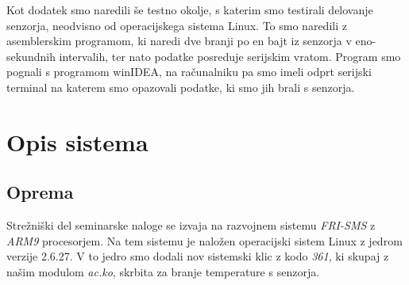\documentclass[10pt,a4paper]{article}
\begin{document}
Kot dodatek smo naredili še testno okolje, s katerim smo testirali delovanje senzorja, neodvisno od operacijskega sistema Linux. To smo naredili z asemblerskim programom, ki naredi dve branji po en bajt iz senzorja v eno-sekundnih intervalih, ter nato podatke posreduje serijskim vratom. Program smo pognali s programom winIDEA, na računalniku pa smo imeli odprt serijski terminal na katerem smo opazovali podatke, ki smo jih brali s senzorja.

\section{Opis sistema}
\subsection{Oprema}
Strežniški del seminarske naloge se izvaja na razvojnem sistemu \emph{FRI-SMS} z \emph{ARM9} procesorjem. Na tem sistemu je naložen operacijski sistem Linux z jedrom verzije 2.6.27. V to jedro smo dodali nov sistemski klic z kodo \emph{361}, ki skupaj z našim modulom \emph{ac.ko}, skrbita za branje temperature s senzorja.\\
\end{document}
